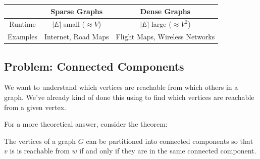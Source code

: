 \documentclass[letterpaper]{article}
\begin{document}
\begin{center}
    \begin{tabular}{c|c|c}
                & \textbf{Sparse Graphs} & \textbf{Dense Graphs} \\ 
        \hline
        Runtime & $|E|$ small ($\approx V$) & $|E|$ large ($\approx V^2$) \\ 
        Examples & Internet, Road Maps & Flight Maps, Wireless Networks 
    \end{tabular}
\end{center}


\subsection{Problem: Connected Components}
We want to understand which vertices are reachable from which others in a graph. We've already kind of done this using  to find which vertices are reachable from a given vertex. 

\bigskip 

For a more theoretical answer, consider the theorem: 
\begin{theorem}{}{}
    The vertices of a graph $G$ can be partitioned into connected components so that $v$ is is reachable from $w$ if and only if they are in the same connected component. 
\end{theorem}
\end{document}
